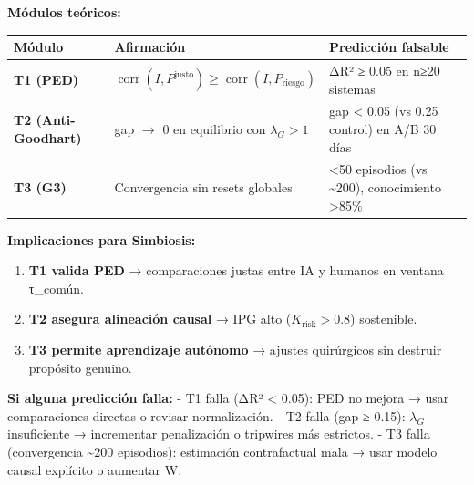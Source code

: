 \textbf{Módulos teóricos:}

{\def\LTcaptype{none} %
\begin{longtable}[]{@{}
  >{\raggedright\arraybackslash}p{}
  >{\raggedright\arraybackslash}p{}
  >{\raggedright\arraybackslash}p{}@{}}
\toprule\noalign{}
\begin{minipage}[b]{\linewidth}\raggedright
Módulo
\end{minipage} & \begin{minipage}[b]{\linewidth}\raggedright
Afirmación
\end{minipage} & \begin{minipage}[b]{\linewidth}\raggedright
Predicción falsable
\end{minipage} \\
\midrule\noalign{}
\endhead
\bottomrule\noalign{}
\endlastfoot
\textbf{T1 (PED)} &
\(\operatorname{corr}(I, P^{\text{justo}}) \geq \operatorname{corr}(I, P_{\text{riesgo}})\)
& ΔR² ≥ 0.05 en n≥20 sistemas \\
\textbf{T2 (Anti-Goodhart)} & gap \(\to\) 0 en equilibrio con
\(\lambda_G > 1\) & gap \textless{} 0.05 (vs 0.25 control) en A/B 30
días \\
\textbf{T3 (G3)} & Convergencia sin resets globales & \textless50
episodios (vs \textasciitilde200), conocimiento \textgreater85\% \\
\end{longtable}
}

\textbf{Implicaciones para Simbiosis:}

\begin{enumerate}
\def\labelenumi{\arabic{enumi}.}
\tightlist
\item
  \textbf{T1 valida PED} → comparaciones justas entre IA y humanos en
  ventana τ\_común.
\item
  \textbf{T2 asegura alineación causal} → IPG alto
  (\(K_{\text{risk}} > 0.8\)) sostenible.
\item
  \textbf{T3 permite aprendizaje autónomo} → ajustes quirúrgicos sin
  destruir propósito genuino.
\end{enumerate}

\textbf{Si alguna predicción falla:} - T1 falla (ΔR² \textless{} 0.05):
PED no mejora → usar comparaciones directas o revisar normalización. -
T2 falla (gap ≥ 0.15): \(\lambda_G\) insuficiente → incrementar
penalización o tripwires más estrictos. - T3 falla (convergencia
\textasciitilde200 episodios): estimación contrafactual mala → usar
modelo causal explícito o aumentar W.

